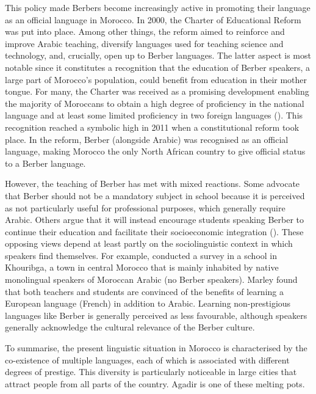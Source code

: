 This policy made Berbers become increasingly active in promoting their language as an official language in Morocco. In 2000, the Charter of Educational Reform was put into place. Among other things, the reform aimed to reinforce and improve Arabic teaching, diversify languages used for teaching science and technology, and, crucially, open up to Berber languages. The latter aspect is most notable since it constitutes a recognition that the education of Berber speakers, a large part of Morocco’s population, could benefit from education in their mother tongue. For many, the Charter was received as a promising development enabling the majority of Moroccans to obtain a high degree of proficiency in the national language and at least some limited proficiency in two foreign languages (\citealt{Berdouzi2000}). This recognition reached a symbolic high in 2011 when a constitutional reform took place. In the reform, Berber (alongside Arabic) was recognised as an official language, making Morocco the only North African country to give official status to a Berber language.

However, the teaching of Berber has met with mixed reactions. Some advocate that Berber should not be a mandatory subject in school because it is perceived as not particularly useful for professional purposes, which generally require Arabic. Others argue that it will instead encourage students speaking Berber to continue their education and facilitate their socioeconomic integration (\citealt{Ennaji2005}). These opposing views depend at least partly on the sociolinguistic context in which speakers find themselves. For example, \citet{Marley2004} conducted a survey in a school in Khouribga, a town in central Morocco that is mainly inhabited by native monolingual speakers of Moroccan Arabic (no Berber speakers). Marley found that both teachers and students are convinced of the benefits of learning a European language (French) in addition to Arabic. Learning non-prestigious languages like Berber is generally perceived as less favourable, although speakers generally acknowledge the cultural relevance of the Berber culture. 

To summarise, the present linguistic situation in Morocco is characterised by the co-existence of multiple languages, each of which is associated with different degrees of prestige. This diversity is particularly noticeable in large cities that attract people from all parts of the country. Agadir is one of these melting pots.

